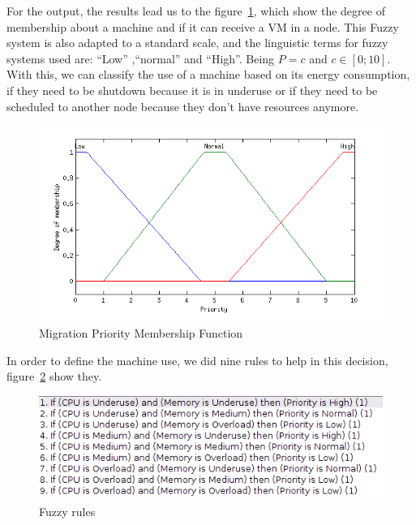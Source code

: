 \documentclass[runningheads,a4paper]{llncs}
\begin{document}
For the output, the results lead us to the figure~\ref{fig:prioridade}, which show the degree of membership about a machine and if it can receive a VM in a node. This Fuzzy system is also adapted to a standard scale, and the linguistic terms for fuzzy systems used are: ``Low'' ,``normal'' and ``High''. Being $P = c$ and $c \in [0;10]$.
With this, we can classify the use of a machine based on its energy consumption,
if they need to be shutdown because it is in underuse or if they need to be scheduled to another node because they don't have resources anymore.
\begin{figure}[H]
    \centering
    \includegraphics[scale=0.7]{imagens/prioridade.png}
    \caption{Migration Priority Membership Function}
    \label{fig:prioridade}
\end{figure}







In order to define the machine use, we did nine rules to help in this decision, figure~\ref{fig:regras} show they.
\begin{figure}[H]
    \centering
    \includegraphics[scale=0.7]{imagens/regras.png}
    \caption{Fuzzy rules}
    \label{fig:regras}
\end{figure}
\end{document}
